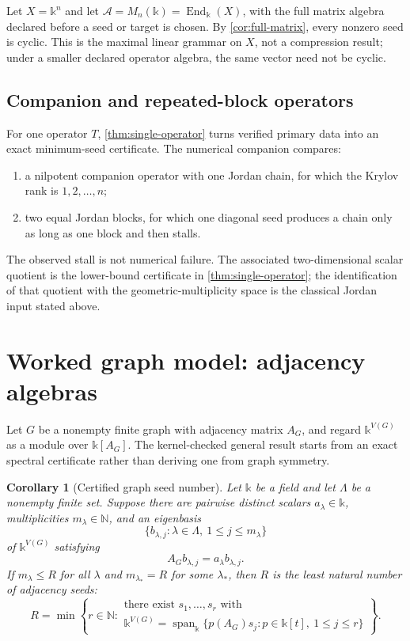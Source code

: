 \documentclass[11pt]{article}
\newtheorem{corollary}[theorem]{Corollary}
\theoremstyle{definition}
\theoremstyle{remark}
\newcommand{\cA}{\mathcal A}
\newcommand{\Span}{\operatorname{span}}
\newcommand{\End}{\operatorname{End}}
\newcommand{\bbk}{\mathbb{k}}
\newcommand{\N}{\mathbb N}
\begin{document}
Let $X=\bbk^n$ and let $\cA=M_n(\bbk)=\End_{\bbk}(X)$, with the full matrix algebra declared before a seed or target is chosen. By \cref{cor:full-matrix}, every nonzero seed is cyclic. This is the maximal linear grammar on $X$, not a compression result; under a smaller declared operator algebra, the same vector need not be cyclic.

\subsection{Companion and repeated-block operators}

For one operator $T$, \cref{thm:single-operator} turns verified primary data
into an exact minimum-seed certificate.  The numerical companion compares:
\begin{enumerate}[label=(\alph*)]
\item a nilpotent companion operator with one Jordan chain, for which the Krylov rank is $1,2,\ldots,n$;
\item two equal Jordan blocks, for which one diagonal seed produces a chain only as long as one block and then stalls.
\end{enumerate}

The observed stall is not numerical failure.  The associated
two-dimensional scalar quotient is the lower-bound certificate in
\cref{thm:single-operator}; the identification of that quotient with the
geometric-multiplicity space is the classical Jordan input stated above.

\section{Worked graph model: adjacency algebras}

Let $G$ be a nonempty finite graph with adjacency matrix $A_G$, and regard
$\bbk^{V(G)}$ as a module over $\bbk[A_G]$.  The kernel-checked general result
starts from an exact spectral certificate rather than deriving one from graph
symmetry.

\begin{corollary}[Certified graph seed number]
\label{cor:graph-rank}
Let $\bbk$ be a field and let $\Lambda$ be a nonempty finite set.  Suppose
there are pairwise distinct scalars $a_{\lambda}\in\bbk$, multiplicities
$m_{\lambda}\in\N$, and an eigenbasis
\[
\{b_{\lambda,j}:\lambda\in\Lambda,\ 1\le j\le m_{\lambda}\}
\]
of $\bbk^{V(G)}$ satisfying
\[
A_Gb_{\lambda,j}=a_{\lambda}b_{\lambda,j}.
\]
If $m_{\lambda}\le R$ for all $\lambda$ and
$m_{\lambda_*}=R$ for some $\lambda_*$, then $R$ is the least natural number
of adjacency seeds:
\[
{
R=\min\left\{r\in\N:
\begin{array}{l}
\text{there exist }s_1,\ldots,s_r\text{ with}\\[2pt]
\bbk^{V(G)}=\Span_{\bbk}
  \{p(A_G)s_j:p\in\bbk[t],\ 1\le j\le r\}
\end{array}
\right\}.
}
\]
\end{corollary}
\end{document}

